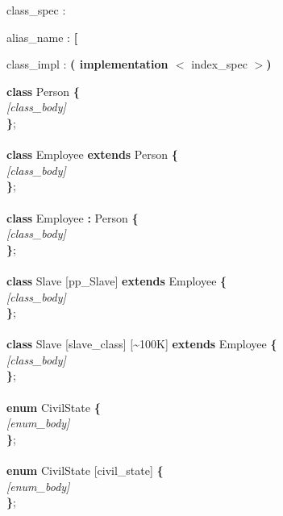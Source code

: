 
\begin{tabbing}
\grindent
class\_spec \> : 
\end{tabbing}

\begin{tabbing}
\grindent
alias\_name \> : {\bf [} \ident {\bf ]}
\end{tabbing}

\begin{tabbing}
\grindent
class\_impl \> : {\bf ( implementation $<$} index\_spec {\bf $>$)}
\end{tabbing}


\begin{tabbing}
{\bf cla}\={\bf ss} Person {\bf \{}\\
\>\emph{[class\_body]}\\
{\bf \}};\\
\\
{\bf class} Employee {\bf extends} Person {\bf \{}\\
\>\emph{[class\_body]}\\
{\bf \}};\\
\\
{\bf class} Employee {\bf :} Person {\bf \{}\\
\>\emph{[class\_body]}\\
{\bf \}};\\
\\
{\bf class} Slave [pp\_Slave] {\bf extends} Employee {\bf \{}\\
\>\emph{[class\_body]}\\
{\bf \}};\\
\\
{\bf class} Slave [slave\_class] [\~{ }100K] {\bf extends} Employee {\bf \{}\\
\>\emph{[class\_body]}\\
{\bf \}};\\
\\
{\bf enum} CivilState {\bf \{}\\
\>\emph{[enum\_body]}\\
{\bf \}};\\
\\
{\bf enum} CivilState [civil\_state] {\bf \{}\\
\>\emph{[enum\_body]}\\
{\bf \}};
\end{tabbing}

